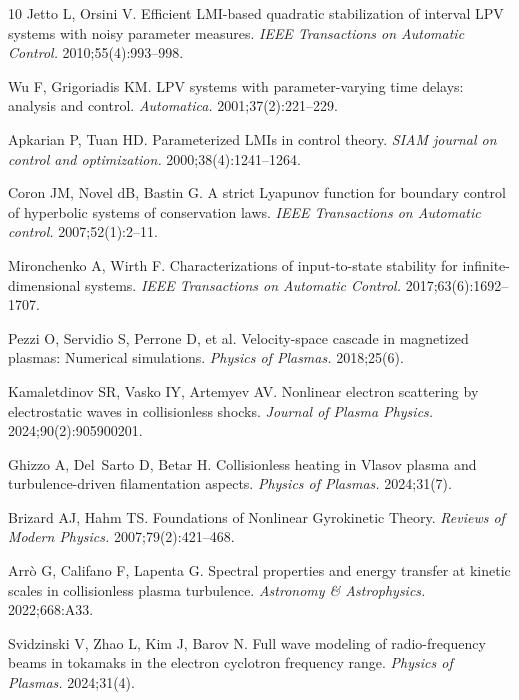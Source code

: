 \documentclass[AMA,Times2COL]{WileyNJDv5}
\begin{document}
\begin{thebibliography}{10}
Jetto L, Orsini V. Efficient LMI-based quadratic stabilization of interval LPV
  systems with noisy parameter measures. {\it IEEE Transactions on Automatic
  Control.} 2010\string;55(4)\string:993--998.

Wu F, Grigoriadis KM. LPV systems with parameter-varying time delays: analysis
  and control. {\it Automatica.} 2001\string;37(2)\string:221--229.

Apkarian P, Tuan HD. Parameterized LMIs in control theory. {\it SIAM journal on
  control and optimization.} 2000\string;38(4)\string:1241--1264.

Coron JM, Novel dB, Bastin G. A strict Lyapunov function for boundary control
  of hyperbolic systems of conservation laws. {\it IEEE Transactions on
  Automatic control.} 2007\string;52(1)\string:2--11.

Mironchenko A, Wirth F. Characterizations of input-to-state stability for
  infinite-dimensional systems. {\it IEEE Transactions on Automatic Control.}
  2017\string;63(6)\string:1692--1707.

Pezzi O, Servidio S, Perrone D, et al. Velocity-space cascade in magnetized
  plasmas: Numerical simulations. {\it Physics of Plasmas.} 2018\string;25(6).

Kamaletdinov SR, Vasko IY, Artemyev AV. Nonlinear electron scattering by
  electrostatic waves in collisionless shocks. {\it Journal of Plasma Physics.}
  2024\string;90(2)\string:905900201.

Ghizzo A, Del~Sarto D, Betar H. Collisionless heating in Vlasov plasma and
  turbulence-driven filamentation aspects. {\it Physics of Plasmas.}
  2024\string;31(7).

Brizard AJ, Hahm TS. Foundations of Nonlinear Gyrokinetic Theory. {\it Reviews
  of Modern Physics.} 2007\string;79(2)\string:421--468.

Arr{\`o} G, Califano F, Lapenta G. Spectral properties and energy transfer at
  kinetic scales in collisionless plasma turbulence. {\it Astronomy \&
  Astrophysics.} 2022\string;668\string:A33.

Svidzinski V, Zhao L, Kim J, Barov N. Full wave modeling of radio-frequency
  beams in tokamaks in the electron cyclotron frequency range. {\it Physics of
  Plasmas.} 2024\string;31(4).


\end{thebibliography}
\end{document}
